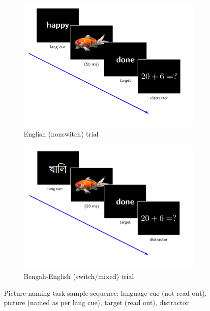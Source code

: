 \documentclass[12 pt]{article}
\begin{document}
\begin{figure}[!htb] \label{figure_picture_task}
	\centering
	\begin{subfigure}[t]{0.49\textwidth}
		\centering
		\includegraphics[scale=1]{images/picture_task_eng}
		\caption{English (nonswitch) trial} \label{picture_task_english}
	\end{subfigure}
	\begin{subfigure}[t]{0.49\textwidth}
		\centering
		\includegraphics[scale=1]{images/picture_task_bengali} 
		\caption{Bengali-English (switch/mixed) trial} \label{picture_trial_bengali}
	\end{subfigure}
	\caption{Picture-naming task sample sequence: language cue (not read out), picture (named as per lang cue), target (read out), distractor}
\end{figure}
\end{document}
